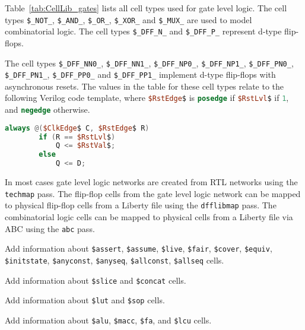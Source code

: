 Table~\ref{tab:CellLib_gates} lists all cell types used for gate level logic. The cell types
{\tt \$\_NOT\_}, {\tt \$\_AND\_}, {\tt \$\_OR\_}, {\tt \$\_XOR\_} and {\tt \$\_MUX\_}
are used to model combinatorial logic. The cell types {\tt \$\_DFF\_N\_} and {\tt \$\_DFF\_P\_}
represent d-type flip-flops.

The cell types {\tt \$\_DFF\_NN0\_}, {\tt \$\_DFF\_NN1\_}, {\tt \$\_DFF\_NP0\_}, {\tt \$\_DFF\_NP1\_},
{\tt \$\_DFF\_PN0\_}, {\tt \$\_DFF\_PN1\_}, {\tt \$\_DFF\_PP0\_} and {\tt \$\_DFF\_PP1\_} implement
d-type flip-flops with asynchronous resets. The values in the table for these cell types relate to the
following Verilog code template, where \lstinline[mathescape,language=Verilog];$RstEdge$; is \lstinline[language=Verilog];posedge;
if \lstinline[mathescape,language=Verilog];$RstLvl$; if \lstinline[language=Verilog];1;, and \lstinline[language=Verilog];negedge;
otherwise.

\begin{lstlisting}[mathescape,language=Verilog]
	always @($ClkEdge$ C, $RstEdge$ R)
		if (R == $RstLvl$)
			Q <= $RstVal$;
		else
			Q <= D;
\end{lstlisting}

In most cases gate level logic networks are created from RTL networks using the {\tt techmap} pass. The flip-flop cells
from the gate level logic network can be mapped to physical flip-flop cells from a Liberty file using the {\tt dfflibmap}
pass. The combinatorial logic cells can be mapped to physical cells from a Liberty file via ABC 
using the {\tt abc} pass.

\begin{fixme}
Add information about {\tt \$assert}, {\tt \$assume}, {\tt \$live}, {\tt \$fair}, {\tt \$cover}, {\tt \$equiv},
{\tt \$initstate}, {\tt \$anyconst}, {\tt \$anyseq}, {\tt \$allconst}, {\tt \$allseq} cells.
\end{fixme}

\begin{fixme}
Add information about {\tt \$slice} and {\tt \$concat} cells.
\end{fixme}

\begin{fixme}
Add information about {\tt \$lut} and {\tt \$sop} cells.
\end{fixme}

\begin{fixme}
Add information about {\tt \$alu}, {\tt \$macc}, {\tt \$fa}, and {\tt \$lcu} cells.
\end{fixme}

